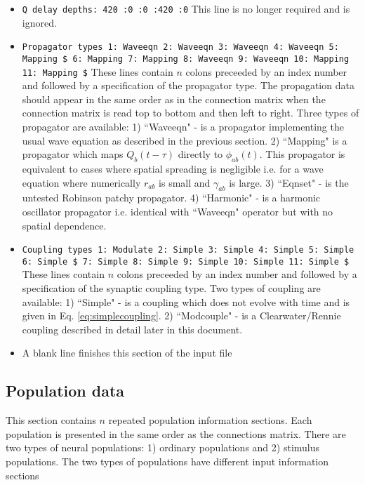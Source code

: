 \documentclass[12pt,a4paper]{article}
\begin{document}
\begin{itemize}
\item {\tt \small Q delay depths: 420 :0 :0 :420 :0} This line is no longer required 
and is ignored.

\item {\tt \small Propagator types 1: Waveeqn 2: Waveeqn 3: Waveeqn 4: Waveeqn 5: Mapping \$
6: Mapping 7: Mapping 8: Waveeqn 9: Waveeqn 10: Mapping 11: Mapping \$} These lines contain
$n$ colons preceeded by an index number and followed by a specification of the propagator
type. The propagation data should appear in the same order as in the connection matrix when the 
connection matrix is read top to bottom and then left to right. Three types of propagator
are available: 1) ``Waveeqn" - is a propagator
implementing the usual wave equation as described in the previous section.
2) ``Mapping" is a propagator which maps $Q_b(t-\tau)$ directly to $\phi_{ab}(t)$. This
propagator is equivalent to cases where spatial spreading is negligible i.e. for a wave equation
where numerically $r_{ab}$ is small and $\gamma_{ab}$ is large. 
3) ``Eqnset" - is the untested Robinson patchy propagator.
4) ``Harmonic" - is a harmonic oscillator propagator i.e. identical with ``Waveeqn" operator 
but with no spatial dependence.
\item {\tt \small Coupling types 1: Modulate 2: Simple 3: Simple 4: Simple 5: Simple 6: Simple \$ 
7: Simple 8: Simple 9: Simple 10: Simple 11: Simple \$} These lines contain
$n$ colons preceeded by an index number and followed by a specification of the synaptic coupling
type. Two types of coupling are available: 1) ``Simple" - is a coupling which does not evolve
with time and is given in Eq. \ref{eq:simplecoupling}. 2) ``Modcouple" - is a Clearwater/Rennie
coupling described in detail later in this document.

\item A blank line finishes this section of the input file
\end{itemize}

\subsection{Population data}
This section contains $n$ repeated population information sections.
Each population is presented in the same order as the connections matrix.
There are two types of neural populations: 1) ordinary populations
and 2) stimulus populations. The two types of populations have different 
input information sections
\end{document}
